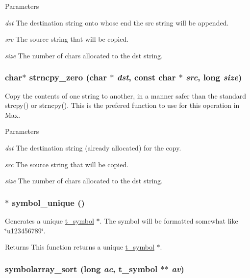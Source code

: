 \begin{DoxyParams}{Parameters}
\item[{\em dst}]The destination string onto whose end the src string will be appended. \item[{\em src}]The source string that will be copied. \item[{\em size}]The number of chars allocated to the dst string. \end{DoxyParams}
\hypertarget{group__misc_ga0022303fac866c8f5757aa56b67ce29d}{
\subsubsection[{strncpy\_\-zero}]{\setlength{\rightskip}{0pt plus 5cm}char$\ast$ strncpy\_\-zero (char $\ast$ {\em dst}, \/  const char $\ast$ {\em src}, \/  long {\em size})}}
\label{group__misc_ga0022303fac866c8f5757aa56b67ce29d}


Copy the contents of one string to another, in a manner safer than the standard strcpy() or strncpy(). This is the prefered function to use for this operation in Max.


\begin{DoxyParams}{Parameters}
\item[{\em dst}]The destination string (already allocated) for the copy. \item[{\em src}]The source string that will be copied. \item[{\em size}]The number of chars allocated to the dst string. \end{DoxyParams}
\hypertarget{group__misc_ga0cb594bfc861d0a72b61c067cd890122}{
\subsubsection[{symbol\_\-unique}]{$\ast$ symbol\_\-unique ()}}
\label{group__misc_ga0cb594bfc861d0a72b61c067cd890122}


Generates a unique \hyperlink{structt__symbol}{t\_\-symbol} $\ast$. The symbol will be formatted somewhat like \char`\"{}u123456789\char`\"{}.

\begin{DoxyReturn}{Returns}
This function returns a unique \hyperlink{structt__symbol}{t\_\-symbol} $\ast$. 
\end{DoxyReturn}
\hypertarget{group__misc_ga751e472fea0842d902012a41f79afcce}{
\subsubsection[{symbolarray\_\-sort}]{ symbolarray\_\-sort (long {\em ac}, \/  {\bf t\_\-symbol} $\ast$$\ast$ {\em av})}}
\label{group__misc_ga751e472fea0842d902012a41f79afcce}


